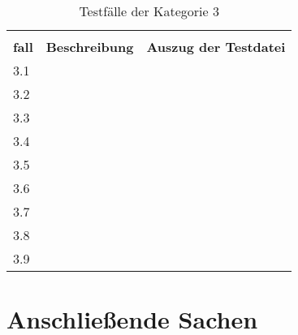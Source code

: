 \begin{table}[htp]
  \centering
  \begin{tabularx}{\columnwidth}{lXl}
    \toprule
    \begin{tabular}{@{}l@{}}\textbf{Test-} \\ \textbf{fall} \end{tabular} & \textbf{Beschreibung} & \textbf{Auszug der Testdatei} \\
    \midrule
    3.1                                                                   &                       &                               \\
    \midrule
    3.2                                                                   &                       &                               \\
    \midrule
    3.3                                                                   &                       &                               \\
    \midrule
    3.4                                                                   &                       &                               \\
    \midrule
    3.5                                                                   &                       &                               \\
    \midrule
    3.6                                                                   &                       &                               \\
    \midrule
    3.7                                                                   &                       &                               \\
    \midrule
    3.8                                                                   &                       &                               \\
    \midrule
    3.9                                                                   &                       &                               \\
    \bottomrule
  \end{tabularx}
  \caption{Testfälle der Kategorie 3}
  \label{tbl:evaluation-test-cases-category-3}
\end{table}







\section{Anschließende Sachen}

